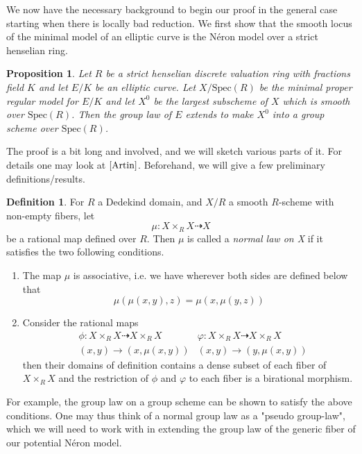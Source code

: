 \documentclass{article}
\theoremstyle{definition}
\newtheorem{definition}[theorem]{Definition}
\theoremstyle{remark}
\theoremstyle{plain}
\newtheorem{proposition}[theorem]{Proposition}
\begin{document}
We now have the necessary background to begin our proof in the general case starting when there is locally bad reduction.
We first show that the smooth locus of the minimal model of an elliptic curve is the N\'eron model over a strict henselian ring.

\begin{proposition}\label{theo:4.7}
	Let $R$ be a strict henselian discrete valuation ring with fractions field $K$ and let $E/K$ be an elliptic curve.
	Let $X/\text{Spec}(R)$ be the minimal proper regular model for $E/K$ and let $X^0$ be the largest subscheme of $X$ which is smooth over $\text{Spec}(R)$.
	Then the group law of $E$ extends to make $X^0$ into a group scheme over $\text{Spec}(R)$. 
\end{proposition}

The proof is a bit long and involved, and we will sketch various parts of it.
For details one may look at $\cite{Artin}$.
Beforehand, we will give a few preliminary definitions/results.

\begin{definition}
	For $R$ a Dedekind domain, and $X/R$ a smooth $R$-scheme with non-empty fibers, let 
	\[\mu: X \times_R X \dashrightarrow X\]
be a rational map defined over $R$.
Then $\mu$ is called a \textit{normal law on X} if it satisfies the two following conditions.
\begin{enumerate}
	\item The map $\mu$ is associative, i.e. we have wherever both sides are defined below that
		\[\mu(\mu(x,y),z) = \mu(x, \mu(y,z))\]
    \item  Consider the rational maps 
		\begin{align*}
			&\phi: X \times_R X \dashrightarrow X \times_R X \quad  &\varphi: X \times_R X \dashrightarrow X \times_R X\\
					&(x,y) \to (x, \mu(x,y)) &(x,y) \to (y, \mu(x,y))
		\end{align*}
	then their domains of definition contains a dense subset of each fiber of $X \times_R X$ and the restriction of $\phi$ and $\varphi$ to each fiber is a birational morphism.	
\end{enumerate}

\end{definition}

For example, the group law on a group scheme can be shown to satisfy the above conditions.
One may thus think of a normal group law as a "pseudo group-law", which we will need to work with in extending the group law of the generic fiber of our potential N\'eron model.
\end{document}
